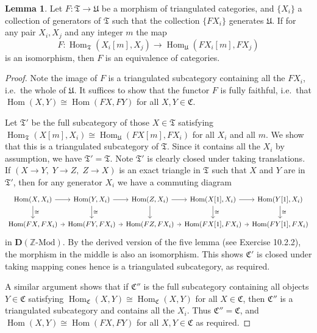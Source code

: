 \documentclass[a4paper]{article}
\theoremstyle{definition}
\newtheorem{lemma}[defn]{Lemma}
\theoremstyle{remark}
\newcommand{\Mod}{\ensuremath{\text{-Mod}}}
\DeclareMathOperator{\Hom}{\text{Hom}}
\newcommand{\deri}{\mathbf{D}}
\begin{document}
\begin{lemma}\label{beilinson-lemma1}
    Let \(F:\mathfrak{T}\rightarrow \mathfrak{U}\) be a morphism of triangulated
    categories, and \(\{X_i\}\) a collection of generators of \(\mathfrak{T}\)
    such that the collection \(\{FX_i\}\) generates
    \(\mathfrak{U}\). If for any pair \(X_i,X_j\) and any integer
    \(m\) the map
    \[F:\Hom_\mathfrak{T}(X_i[m],X_j)\rightarrow
    \Hom_\mathfrak{U}(FX_i[m],FX_j)\]
    is an isomorphism, then \(F\) is an equivalence of categories.
    \begin{proof}
        Note the image of \(F\) is a triangulated subcategory containing all the
        \(FX_i\), i.e.\ the whole of \(\mathfrak{U}\). It suffices to show that
        the functor \(F\) is fully faithful, i.e.\ that \(\Hom(X,Y)\cong
        \Hom(FX,FY)\) for all \(X,Y\in \mathfrak{C}\). 

        Let \(\mathfrak{T}'\) be the full subcategory of those
        \(X\in \mathfrak{T}\) satisfying \({\Hom_\mathfrak{T}(X[m],X_i)\cong
        \Hom_\mathfrak{U}(FX[m],FX_i)}\) for all \(X_i\) and all \(m\). We show
        that this is a triangulated subcategory of \(\mathfrak{T}\). Since
        it contains all the \(X_i\) by assumption, we have
        \(\mathfrak{T}'=\mathfrak{T}\).  Note \(\mathfrak{T}'\) is clearly
        closed under taking translations. If \((X\rightarrow Y,\; Y\rightarrow
        Z, \; Z\rightarrow X)\) is an exact triangle in \(\mathfrak{T}\) such
        that \(X\) and \(Y\) are in \(\mathfrak{T}'\), then for any generator
        \(X_i\) we have a commuting diagram 
        \[\begin{tikzcd}[column sep= tiny]
            \Hom(X,X_i) \arrow[r] \arrow[d, "\cong"]
            &\Hom(Y,X_i) \arrow[r] \arrow[d, "\cong"]
            &\Hom(Z,X_i) \arrow[r] \arrow[d]
            &\Hom(X[1],X_i) \arrow[r] \arrow[d, "\cong"]
            &\Hom(Y[1],X_i) \arrow[d, "\cong"] \\
            \Hom(FX,FX_i) \arrow[r] 
            &\Hom(FY,FX_i) \arrow[r] 
            &\Hom(FZ,FX_i) \arrow[r]
            &\Hom(FX[1],FX_i) \arrow[r] 
            &\Hom(FY[1],FX_i) 
        \end{tikzcd}\]
        in \(\deri(\mathbb{Z}\Mod)\). By the derived version of the five lemma
        (see  Exercise 10.2.2),
        the morphism in the middle is also an isomorphism. This shows
        \(\mathfrak{C}'\) is closed under taking mapping cones hence is a
        triangulated subcategory, as required.

        A similar argument shows that if \(\mathfrak{C}''\) is the full
        subcategory containing all objects \(Y\in \mathfrak{C}\) satisfying
        \({\Hom_\mathfrak{C}(X, Y)\cong \Hom_\mathfrak{C}(X,Y)}\) for all \(X\in
        \mathfrak{C}\), then \(\mathfrak{C}''\) is a triangulated subcategory
        and contains all the \(X_i\). Thus \(\mathfrak{C}''=\mathfrak{C}\), and
        \(\Hom(X,Y)\cong \Hom(FX,FY)\) for all \(X,Y\in \mathfrak{C}\) as
        required.
    \end{proof}
\end{lemma}
\end{document}
